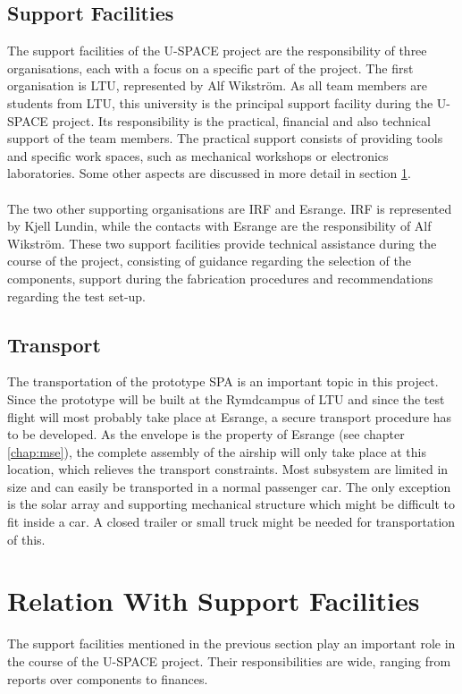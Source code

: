 \subsection{Support Facilities}
%
The support facilities of the \ac{U-SPACE} project are the responsibility of three organisations, each with a focus on a specific part of the project. The first organisation is \ac{LTU}, represented by Alf Wikström. As all team members are students from \ac{LTU}, this university is the principal support facility during the \ac{U-SPACE} project. Its responsibility is the practical, financial and also technical support of the team members. The practical support consists of providing tools and specific work spaces, such as mechanical workshops or electronics laboratories. Some other aspects are discussed in more detail in section \ref{sec:relation_support}.
\\
\\
The two other supporting organisations are \ac{IRF} and Esrange. \ac{IRF} is represented by Kjell Lundin, while the contacts with Esrange are the responsibility of Alf Wikström. These two support facilities provide technical assistance during the course of the project, consisting of guidance regarding the selection of the components, support during the fabrication procedures and recommendations regarding the test set-up.
%
\subsection{Transport}
%
The transportation of the prototype \ac{SPA} is an important topic in this project. Since the prototype will be built at the Rymdcampus of \ac{LTU} and since the test flight will most probably take place at Esrange, a secure transport procedure has to be developed. As the envelope is the property of Esrange (see chapter \ref{chap:mse}), the complete assembly of the airship will only take place at this location, which relieves the transport constraints. Most subsystem are limited in size and can easily be  transported in a normal passenger car. The only exception is the solar array and supporting mechanical structure which might be difficult to fit inside a car. A closed trailer or small truck might be needed for transportation of this.
%
%
\section{Relation With Support Facilities}
\label{sec:relation_support}
%
The support facilities mentioned in the previous section play an important role in the course of the \ac{U-SPACE} project. Their responsibilities are wide, ranging from reports over components to finances.
%
